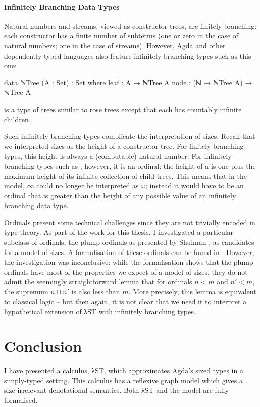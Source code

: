 \paragraph{Infinitely Branching Data Types}

Natural numbers and streams, viewed as constructor trees, are finitely
branching: each constructor has a finite number of subterms (one or zero in the
case of natural numbers; one in the case of streams). However, Agda and other
dependently typed languages also feature infinitely branching types such as this
one:
\begin{code}
  data ℕTree (A : Set) : Set where
    leaf : A → ℕTree A
    node : (ℕ → ℕTree A) → ℕTree A
\end{code}
 is a type of trees similar to rose trees except that each
 has countably infinite children.

Such infinitely branching types complicate the interpretation of sizes. Recall
that we interpreted sizes as the height of a constructor tree. For finitely
branching types, this height is always a (computable) natural number. For
infinitely branching types such as , however, it is an ordinal: the
height of a  is one plus the maximum height of its infinite
collection of child trees. This means that in the model, $∞$ could no longer be
interpreted as $ω$; instead it would have to be an ordinal that is greater than
the height of any possible value of an infinitely branching data type.

Ordinals present some technical challenges since they are not trivially encoded
in type theory. As part of the work for this thesis, I investigated a particular
subclass of ordinals, the plump ordinals \cite{taylor1996} as presented by
Shulman \cite{shulman2014}, as candidates for a model of sizes. A formalisation
of these ordinals can be found in . However, the investigation was inconclusive: while
the formalisation shows that the plump ordinals have most of the properties we
expect of a model of sizes, they do not admit the seemingly straightforward
lemma that for ordinals $n < m$ and $n′ < m$, the supremum $n ⊔ n′$ is also less
than $m$. More precisely, this lemma is equivalent to classical logic -- but
then again, it is not clear that we need it to interpret a hypothetical
extension of λST with infinitely branching types.


\section{Conclusion}
\label{sec:conclusion:conclusion}

I have presented a calculus, λST, which approximates Agda's sized types in a
simply-typed setting. This calculus has a reflexive graph model which gives a
size-irrelevant denotational semantics. Both λST and the model are fully
formalised.
